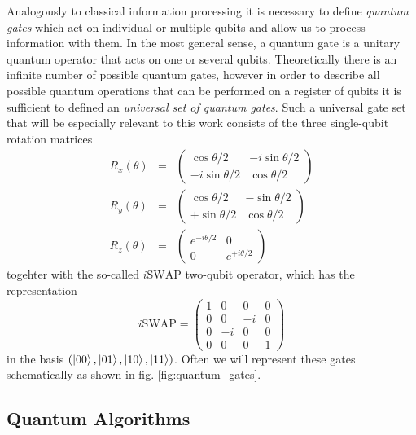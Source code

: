 Analogously to classical information processing it is necessary to define {\it quantum gates} which act on individual or multiple qubits and allow us to process information with them. In the most general sense, a quantum gate is a unitary quantum operator that acts on one or several qubits. Theoretically there is an infinite number of possible quantum gates, however in order to describe all possible quantum operations that can be performed on a register of qubits it is sufficient to defined an {\it universal set of quantum gates}. Such a universal gate set that will be especially relevant to this work consists of the three single-qubit rotation matrices
%
\begin{eqnarray}
   R_x(\theta)  & = & \left( \begin{array}{cc} \cos{\theta/2} & -i\sin{\theta/2} \\ -i\sin{\theta/2}  & \cos{\theta/2} \end{array} \right) \\ 
   R_y(\theta)  & = & \left( \begin{array}{cc} \cos{\theta/2} & -\sin{\theta/2} \\ +\sin{\theta/2} & \cos{\theta/2} \end{array} \right) \\
   R_z(\theta)  & = & \left( \begin{array}{cc} e^{-i\theta/2} & 0 \\ 0  & e^{+i\theta/2} \end{array} \right) 
\label{eq:grover_phase_decoherence}
\end{eqnarray}
%
togehter with the so-called $i\mathrm{SWAP}$ two-qubit operator, which has the representation
%
\begin{equation}
i\mathrm{SWAP} = \left( \begin{array}{cccc} 1 & 0 & 0 & 0 \\ 0 & 0 & -i & 0 \\ 0 & -i & 0 & 0 \\ 0 & 0 & 0 & 1  \end{array}  \right)
\end{equation}
%
in the basis $(\left| 00 \right>,\left| 01 \right>,\left| 10 \right>,\left| 11 \right>)$. Often we will represent these gates schematically as shown in fig. \ref{fig:quantum_gates}.

\subsection{Quantum Algorithms}

